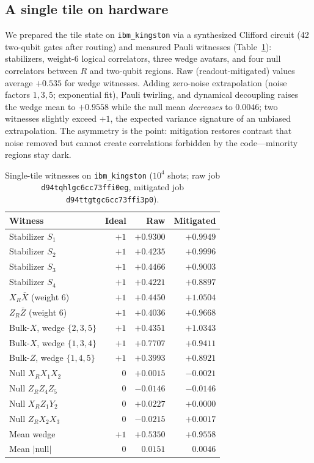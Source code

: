 \documentclass[11pt]{article}
\begin{document}
\subsection{A single tile on hardware}

We prepared the tile state on \texttt{ibm\_kingston} via a synthesized
Clifford circuit (42 two-qubit gates after routing) and measured Pauli
witnesses (Table~\ref{tab:tile}): stabilizers, weight-6 logical
correlators, three wedge avatars, and four null correlators between $R$
and two-qubit regions. Raw (readout-mitigated) values average $+0.535$
for wedge witnesses. Adding zero-noise extrapolation (noise factors
$1,3,5$; exponential fit), Pauli twirling, and dynamical decoupling
raises the wedge mean to $+0.9558$ while the null mean \emph{decreases}
to $0.0046$; two witnesses slightly exceed $+1$, the expected
variance signature of an unbiased extrapolation. The asymmetry is the
point: mitigation restores contrast that noise removed but cannot
create correlations forbidden by the code---minority regions stay dark.

\begin{table}[t]
\centering
\small
\begin{tabular}{lrrr}
\toprule
Witness & Ideal & Raw & Mitigated \\
\midrule
Stabilizer $S_1$ & $+1$ & $+0.9300$ & $+0.9949$ \\
Stabilizer $S_2$ & $+1$ & $+0.4235$ & $+0.9996$ \\
Stabilizer $S_3$ & $+1$ & $+0.4466$ & $+0.9003$ \\
Stabilizer $S_4$ & $+1$ & $+0.4221$ & $+0.8897$ \\
$X_R \bar X$ (weight 6) & $+1$ & $+0.4450$ & $+1.0504$ \\
$Z_R \bar Z$ (weight 6) & $+1$ & $+0.4036$ & $+0.9668$ \\
Bulk-$X$, wedge $\{2,3,5\}$ & $+1$ & $+0.4351$ & $+1.0343$ \\
Bulk-$X$, wedge $\{1,3,4\}$ & $+1$ & $+0.7707$ & $+0.9411$ \\
Bulk-$Z$, wedge $\{1,4,5\}$ & $+1$ & $+0.3993$ & $+0.8921$ \\
Null $X_R X_1 X_2$ & $0$ & $+0.0015$ & $-0.0021$ \\
Null $Z_R Z_4 Z_5$ & $0$ & $-0.0146$ & $-0.0146$ \\
Null $X_R Z_1 Y_2$ & $0$ & $+0.0227$ & $+0.0000$ \\
Null $Z_R X_2 X_3$ & $0$ & $-0.0215$ & $+0.0017$ \\
\midrule
Mean wedge & $+1$ & $+0.5350$ & $+0.9558$ \\
Mean $|$null$|$ & $0$ & $0.0151$ & $0.0046$ \\
\bottomrule
\end{tabular}
\caption{Single-tile witnesses on \texttt{ibm\_kingston}
($10^4$ shots; raw job \texttt{d94tqhlgc6cc73ffi0eg}, mitigated job
\texttt{d94ttgtgc6cc73ffi3p0}).}
\label{tab:tile}
\end{table}
\end{document}

